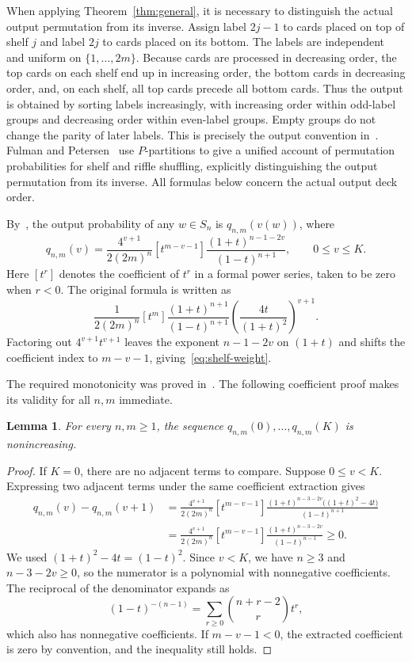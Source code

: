 \documentclass[10pt,a4paper]{amsart}
\numberwithin{equation}{section}
\newtheorem{lemma}[theorem]{Lemma}
\begin{document}
When applying Theorem~\ref{thm:general}, it is necessary to distinguish the actual output permutation from its inverse. Assign label $2j-1$ to cards placed on top of shelf $j$ and label $2j$ to cards placed on its bottom. The labels are independent and uniform on $\{1,\ldots,2m\}$. Because cards are processed in decreasing order, the top cards on each shelf end up in increasing order, the bottom cards in decreasing order, and, on each shelf, all top cards precede all bottom cards. Thus the output is obtained by sorting labels increasingly, with increasing order within odd-label groups and decreasing order within even-label groups. Empty groups do not change the parity of later labels. This is precisely the output convention in~\cite[Section 3.1, Description 1]{DFH}. Fulman and Petersen~\cite{FP} use $P$-partitions to give a unified account of permutation probabilities for shelf and riffle shuffling, explicitly distinguishing the output permutation from its inverse. All formulas below concern the actual output deck order.

By~\cite[Theorem 3.1]{DFH}, the output probability of any $w\in S_n$ is $q_{n,m}(v(w))$, where
\begin{equation}\label{eq:shelf-weight}
 q_{n,m}(v)=\frac{4^{v+1}}{2(2m)^n}
 [t^{m-v-1}]\frac{(1+t)^{n-1-2v}}{(1-t)^{n+1}},
 \qquad 0\le v\le K.
\end{equation}
Here $[t^r]$ denotes the coefficient of $t^r$ in a formal power series, taken to be zero when $r<0$. The original formula is written as
\[
 \frac{1}{2(2m)^n}[t^m]
 \frac{(1+t)^{n+1}}{(1-t)^{n+1}}
 \left(\frac{4t}{(1+t)^2}\right)^{v+1}.
\]
Factoring out $4^{v+1}t^{v+1}$ leaves the exponent $n-1-2v$ on $(1+t)$ and shifts the coefficient index to $m-v-1$, giving~\eqref{eq:shelf-weight}.

The required monotonicity was proved in~\cite[Corollary 3.3]{DFH}. The following coefficient proof makes its validity for all $n,m$ immediate.

\begin{lemma}\label{lem:weight}
For every $n,m\ge1$, the sequence $q_{n,m}(0),\ldots,q_{n,m}(K)$ is nonincreasing.
\end{lemma}
\begin{proof}
If $K=0$, there are no adjacent terms to compare. Suppose $0\le v<K$. Expressing two adjacent terms under the same coefficient extraction gives
\begin{align*}
 q_{n,m}(v)-q_{n,m}(v+1)
 &=\frac{4^{v+1}}{2(2m)^n}[t^{m-v-1}]
 \frac{(1+t)^{n-3-2v}\bigl((1+t)^2-4t\bigr)}{(1-t)^{n+1}}\\
 &=\frac{4^{v+1}}{2(2m)^n}[t^{m-v-1}]
 \frac{(1+t)^{n-3-2v}}{(1-t)^{n-1}}\ge0.
\end{align*}
We used $(1+t)^2-4t=(1-t)^2$. Since $v<K$, we have $n\ge3$ and $n-3-2v\ge0$, so the numerator is a polynomial with nonnegative coefficients. The reciprocal of the denominator expands as
\[
 (1-t)^{-(n-1)}=\sum_{r\ge0}\binom{n+r-2}{r}t^r,
\]
which also has nonnegative coefficients. If $m-v-1<0$, the extracted coefficient is zero by convention, and the inequality still holds.
\end{proof}
\end{document}

